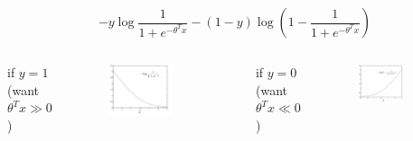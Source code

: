 \documentclass[9pt,dvipsnames]{beamer}
\begin{document}
	\begin{frame}
		\[
		-y \log \frac{1}{1+e^{-\theta^T x}}-(1-y) \log \left(1-\frac{1}{1+e^{-\theta^T x}}\right)
		\]
		\begin{columns}
			if \(y=1\) (want $\theta^T x \gg 0$)
			\begin{figure}
				\centering
				\includegraphics[width=0.7\textwidth]{imgs/svm_2.png}
			\end{figure}
			if \(y=0\) (want $\theta^T x \ll 0$)
			\begin{figure}
				\centering
				\includegraphics[width=0.7\textwidth]{imgs/svm_3.png}
			\end{figure}
		\end{columns}
	\end{frame}
	
\end{document}
